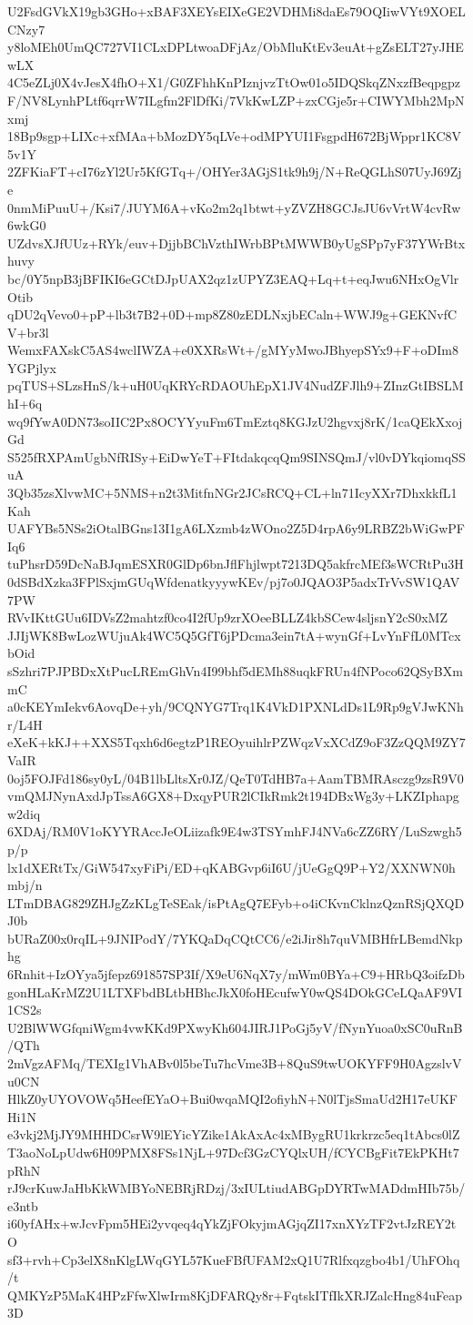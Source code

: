 U2FsdGVkX19gb3GHo+xBAF3XEYsEIXeGE2VDHMi8daEs79OQIiwVYt9XOELCNzy7
y8loMEh0UmQC727VI1CLxDPLtwoaDFjAz/ObMluKtEv3euAt+gZsELT27yJHEwLX
4C5eZLj0X4vJesX4fhO+X1/G0ZFhhKnPIznjvzTtOw01o5IDQSkqZNxzfBeqpgpz
F/NV8LynhPLtf6qrrW7ILgfm2FlDfKi/7VkKwLZP+zxCGje5r+CIWYMbh2MpNxmj
18Bp9sgp+LIXc+xfMAa+bMozDY5qLVe+odMPYUI1FsgpdH672BjWppr1KC8V5v1Y
2ZFKiaFT+cI76zYl2Ur5KfGTq+/OHYer3AGjS1tk9h9j/N+ReQGLhS07UyJ69Zje
0nmMiPuuU+/Ksi7/JUYM6A+vKo2m2q1btwt+yZVZH8GCJsJU6vVrtW4cvRw6wkG0
UZdvsXJfUUz+RYk/euv+DjjbBChVzthIWrbBPtMWWB0yUgSPp7yF37YWrBtxhuvy
bc/0Y5npB3jBFIKI6eGCtDJpUAX2qz1zUPYZ3EAQ+Lq+t+eqJwu6NHxOgVlrOtib
qDU2qVevo0+pP+lb3t7B2+0D+mp8Z80zEDLNxjbECaln+WWJ9g+GEKNvfCV+br3l
WemxFAXskC5AS4wclIWZA+e0XXRsWt+/gMYyMwoJBhyepSYx9+F+oDIm8YGPjlyx
pqTUS+SLzsHnS/k+uH0UqKRYcRDAOUhEpX1JV4NudZFJlh9+ZInzGtIBSLMhI+6q
wq9fYwA0DN73soIIC2Px8OCYYyuFm6TmEztq8KGJzU2hgvxj8rK/1caQEkXxojGd
S525fRXPAmUgbNfRISy+EiDwYeT+FItdakqcqQm9SINSQmJ/vl0vDYkqiomqSSuA
3Qb35zsXlvwMC+5NMS+n2t3MitfnNGr2JCsRCQ+CL+ln71IcyXXr7DhxkkfL1Kah
UAFYBs5NSs2iOtalBGns13I1gA6LXzmb4zWOno2Z5D4rpA6y9LRBZ2bWiGwPFIq6
tuPhsrD59DcNaBJqmESXR0GlDp6bnJflFhjlwpt7213DQ5akfrcMEf3sWCRtPu3H
0dSBdXzka3FPlSxjmGUqWfdenatkyyywKEv/pj7o0JQAO3P5adxTrVvSW1QAV7PW
RVvIKttGUu6IDVsZ2mahtzf0co4I2fUp9zrXOeeBLLZ4kbSCew4sljsnY2cS0xMZ
JJIjWK8BwLozWUjuAk4WC5Q5GfT6jPDcma3ein7tA+wynGf+LvYnFfL0MTcxbOid
sSzhri7PJPBDxXtPucLREmGhVn4I99bhf5dEMh88uqkFRUn4fNPoco62QSyBXmmC
a0cKEYmIekv6AovqDe+yh/9CQNYG7Trq1K4VkD1PXNLdDs1L9Rp9gVJwKNhr/L4H
eXeK+kKJ++XXS5Tqxh6d6egtzP1REOyuihlrPZWqzVxXCdZ9oF3ZzQQM9ZY7VaIR
0oj5FOJFd186sy0yL/04B1lbLltsXr0JZ/QeT0TdHB7a+AamTBMRAsczg9zsR9V0
vmQMJNynAxdJpTssA6GX8+DxqyPUR2lCIkRmk2t194DBxWg3y+LKZIphapgw2diq
6XDAj/RM0V1oKYYRAccJeOLiizafk9E4w3TSYmhFJ4NVa6cZZ6RY/LuSzwgh5p/p
lx1dXERtTx/GiW547xyFiPi/ED+qKABGvp6iI6U/jUeGgQ9P+Y2/XXNWN0hmbj/n
LTmDBAG829ZHJgZzKLgTeSEak/isPtAgQ7EFyb+o4iCKvnCklnzQznRSjQXQDJ0b
bURaZ00x0rqIL+9JNIPodY/7YKQaDqCQtCC6/e2iJir8h7quVMBHfrLBemdNkphg
6Rnhit+IzOYya5jfepz691857SP3If/X9eU6NqX7y/mWm0BYa+C9+HRbQ3oifzDb
gonHLaKrMZ2U1LTXFbdBLtbHBhcJkX0foHEcufwY0wQS4DOkGCeLQaAF9VI1CS2s
U2BlWWGfqniWgm4vwKKd9PXwyKh604JIRJ1PoGj5yV/fNynYuoa0xSC0uRnB/QTh
2mVgzAFMq/TEXIg1VhABv0l5beTu7hcVme3B+8QuS9twUOKYFF9H0AgzslvVu0CN
HlkZ0yUYOVOWq5HeefEYaO+Bui0wqaMQI2ofiyhN+N0lTjsSmaUd2H17eUKFHi1N
e3vkj2MjJY9MHHDCsrW9lEYicYZike1AkAxAc4xMBygRU1krkrzc5eq1tAbcs0lZ
T3aoNoLpUdw6H09PMX8FSs1NjL+97Dcf3GzCYQlxUH/fCYCBgFit7EkPKHt7pRhN
rJ9crKuwJaHbKkWMBYoNEBRjRDzj/3xIULtiudABGpDYRTwMADdmHIb75b/e3ntb
i60yfAHx+wJcvFpm5HEi2yvqeq4qYkZjFOkyjmAGjqZI17xnXYzTF2vtJzREY2tO
sf3+rvh+Cp3elX8nKlgLWqGYL57KueFBfUFAM2xQ1U7Rlfxqzgbo4b1/UhFOhq/t
QMKYzP5MaK4HPzFfwXlwIrm8KjDFARQy8r+FqtskITfIkXRJZalcHng84uFeap3D
